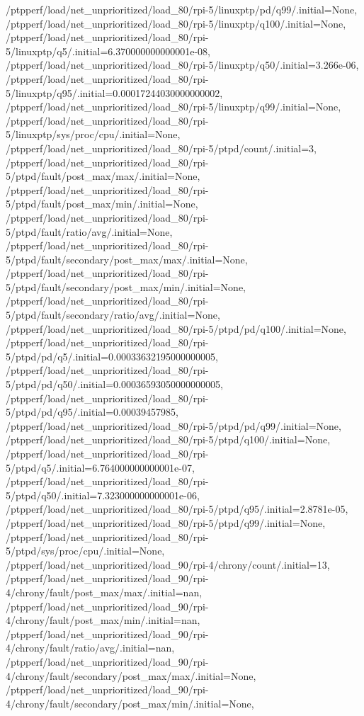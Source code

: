 {    /ptpperf/load/net_unprioritized/load_80/rpi-5/linuxptp/pd/q99/.initial=None,
    /ptpperf/load/net_unprioritized/load_80/rpi-5/linuxptp/q100/.initial=None,
    /ptpperf/load/net_unprioritized/load_80/rpi-5/linuxptp/q5/.initial=6.370000000000001e-08,
    /ptpperf/load/net_unprioritized/load_80/rpi-5/linuxptp/q50/.initial=3.266e-06,
    /ptpperf/load/net_unprioritized/load_80/rpi-5/linuxptp/q95/.initial=0.00017244030000000002,
    /ptpperf/load/net_unprioritized/load_80/rpi-5/linuxptp/q99/.initial=None,
    /ptpperf/load/net_unprioritized/load_80/rpi-5/linuxptp/sys/proc/cpu/.initial=None,
    /ptpperf/load/net_unprioritized/load_80/rpi-5/ptpd/count/.initial=3,
    /ptpperf/load/net_unprioritized/load_80/rpi-5/ptpd/fault/post_max/max/.initial=None,
    /ptpperf/load/net_unprioritized/load_80/rpi-5/ptpd/fault/post_max/min/.initial=None,
    /ptpperf/load/net_unprioritized/load_80/rpi-5/ptpd/fault/ratio/avg/.initial=None,
    /ptpperf/load/net_unprioritized/load_80/rpi-5/ptpd/fault/secondary/post_max/max/.initial=None,
    /ptpperf/load/net_unprioritized/load_80/rpi-5/ptpd/fault/secondary/post_max/min/.initial=None,
    /ptpperf/load/net_unprioritized/load_80/rpi-5/ptpd/fault/secondary/ratio/avg/.initial=None,
    /ptpperf/load/net_unprioritized/load_80/rpi-5/ptpd/pd/q100/.initial=None,
    /ptpperf/load/net_unprioritized/load_80/rpi-5/ptpd/pd/q5/.initial=0.00033632195000000005,
    /ptpperf/load/net_unprioritized/load_80/rpi-5/ptpd/pd/q50/.initial=0.00036593050000000005,
    /ptpperf/load/net_unprioritized/load_80/rpi-5/ptpd/pd/q95/.initial=0.00039457985,
    /ptpperf/load/net_unprioritized/load_80/rpi-5/ptpd/pd/q99/.initial=None,
    /ptpperf/load/net_unprioritized/load_80/rpi-5/ptpd/q100/.initial=None,
    /ptpperf/load/net_unprioritized/load_80/rpi-5/ptpd/q5/.initial=6.764000000000001e-07,
    /ptpperf/load/net_unprioritized/load_80/rpi-5/ptpd/q50/.initial=7.323000000000001e-06,
    /ptpperf/load/net_unprioritized/load_80/rpi-5/ptpd/q95/.initial=2.8781e-05,
    /ptpperf/load/net_unprioritized/load_80/rpi-5/ptpd/q99/.initial=None,
    /ptpperf/load/net_unprioritized/load_80/rpi-5/ptpd/sys/proc/cpu/.initial=None,
    /ptpperf/load/net_unprioritized/load_90/rpi-4/chrony/count/.initial=13,
    /ptpperf/load/net_unprioritized/load_90/rpi-4/chrony/fault/post_max/max/.initial=nan,
    /ptpperf/load/net_unprioritized/load_90/rpi-4/chrony/fault/post_max/min/.initial=nan,
    /ptpperf/load/net_unprioritized/load_90/rpi-4/chrony/fault/ratio/avg/.initial=nan,
    /ptpperf/load/net_unprioritized/load_90/rpi-4/chrony/fault/secondary/post_max/max/.initial=None,
    /ptpperf/load/net_unprioritized/load_90/rpi-4/chrony/fault/secondary/post_max/min/.initial=None,
}
